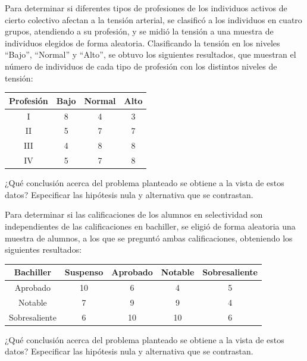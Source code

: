 \begin{ejercicio}
    Para determinar si diferentes tipos de profesiones de los individuos activos de cierto colectivo afectan a la tensión arterial, se clasificó a los individuos en cuatro grupos, atendiendo a su profesión, y se midió la tensión a una muestra de individuos elegidos de forma aleatoria. Clasificando la tensión en los niveles ``Bajo'', ``Normal'' y ``Alto'', se obtuvo los siguientes resultados, que muestran el número de individuos de cada tipo de profesión con los distintos niveles de tensión:
    \begin{table}[H]
    \centering
    \begin{tabular}{|c|c|c|c|}
        \hline
        Profesión & Bajo & Normal & Alto \\
        \hline
        I & 8 & 4 & 3 \\ 
        \hline
        II & 5 & 7 & 7 \\
        \hline
        III & 4 & 8 & 8 \\
        \hline
        IV & 5 & 7 & 8 \\
        \hline
    \end{tabular}
    \end{table}
    \noindent
    ¿Qué conclusión acerca del problema planteado se obtiene a la vista de estos datos?  Especificar las hipótesis nula y alternativa que se contrastan.
\end{ejercicio}

\begin{ejercicio}
    Para determinar si las calificaciones de los alumnos en selectividad son independientes de las calificaciones en bachiller, se eligió de forma aleatoria una muestra de alumnos, a los que se preguntó ambas calificaciones, obteniendo los siguientes resultados:
    \begin{table}[H]
    \centering
    \begin{tabular}{|c|c|c|c|c|}
        \hline
        Bachiller & Suspenso & Aprobado & Notable & Sobresaliente \\
        \hline
        Aprobado & 10 & 6 & 4 & 5 \\
        \hline
        Notable & 7 & 9 & 9 & 4 \\
        \hline
        Sobresaliente & 6 & 10 & 10 & 6 \\
        \hline
    \end{tabular}
    \end{table}
    \noindent
    ¿Qué conclusión acerca del problema planteado se obtiene a la vista de estos datos?  Especificar las hipótesis nula y alternativa que se contrastan.
\end{ejercicio}
